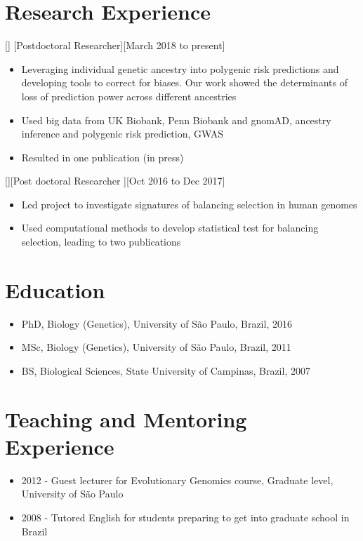 \documentclass{article}
\begin{document}
\section{Research Experience}

[]
[Postdoctoral Researcher][March 2018 to present]

\begin{itemize}
\item Leveraging individual genetic ancestry into polygenic risk predictions and developing tools to correct for biases. Our work showed the determinants of loss of prediction power
across different ancestries
\item Used big data from UK Biobank, Penn Biobank and gnomAD, ancestry inference and polygenic risk prediction, GWAS
\item Resulted in one publication (in press)
\end{itemize}

[][Post doctoral Researcher ][Oct 2016 to Dec 2017]

\begin{itemize}
\item Led project to investigate signatures of balancing selection in human genomes
\item Used computational methods to develop statistical test for balancing selection, leading to two publications
\end{itemize}

 
\section{Education}

\begin{itemize}
\item PhD, Biology (Genetics), University of São Paulo, Brazil, 2016
\item MSc, Biology (Genetics), University of São Paulo, Brazil, 2011
\item BS, Biological Sciences, State University of Campinas, Brazil, 2007
\end{itemize}
 
\section{Teaching and Mentoring Experience }
\begin{itemize}
\item 2012 - Guest lecturer for Evolutionary Genomics course, Graduate level, University of São Paulo
\item 2008 - Tutored English for students preparing to get into graduate school in Brazil
\end{itemize}
\end{document}
